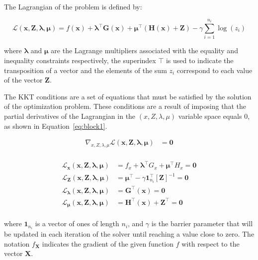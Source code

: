 The Lagrangian of the problem is defined by:

\begin{equation}
    \mathcal{L}(\bm{x}, \bm{Z}, \bm{\lambda}, \bm{\mu}) = f(\bm{x}) + \bm{\lambda}^\top \bm{G}(\bm{x}) + \bm{\mu}^\top (\bm{H}(\bm{x})+\bm{Z}) - \gamma \sum_{i=1}^{n_i} \log(z_i) 
    \label{eq:lag}
\end{equation}
    
where $\bm{\lambda}$ and $\bm{\mu}$ are the Lagrange multipliers associated with the equality and inequality constraints respectively, the superindex $\top$ is used to indicate the transposition
of a vector and the elements of the sum $z_i$ correspond to each value of the vector $\bm{Z}$.

The KKT conditions are a set of equations that must be satisfied by the solution of the optimization problem. These conditions are a result of 
imposing that the partial derivatives of the Lagrangian in the $(x, Z, \lambda, \mu)$ variable space equals 0, as shown in Equation~\eqref{eq:block1}.

\begin{equation}
    \begin{split}
    \nabla_{x, Z, \lambda, \mu} \mathcal{L}(\bm{x}, \bm{Z}, \bm{\lambda}, \bm{\mu}) &= \bm{0} \\
    \end{split}
    \end{equation}

\begin{equation}
    \begin{split}
    \bm{\mathcal{L}_x}(\bm{x}, \bm{Z}, \bm{\lambda}, \bm{\mu}) &=  f_x + \bm{\lambda}^\top G_x + \bm{\mu}^\top H_x = \bm{0} \\
    \bm{\mathcal{L}_Z}(\bm{x}, \bm{Z}, \bm{\lambda}, \bm{\mu}) &=  \bm{\mu}^\top - \gamma \bm{1}_{n_i}^\top[\bm{Z}]^{-1} = \bm{0} \\
    \bm{\mathcal{L}_{\lambda}}(\bm{x}, \bm{Z}, \bm{\lambda}, \bm{\mu}) &=  \bm{G}^\top(\bm{x}) = \bm{0} \\
    \bm{\mathcal{L}_{\mu}}(\bm{x}, \bm{Z}, \bm{\lambda}, \bm{\mu}) &=  \bm{H}^\top(\bm{x}) + \bm{Z}^\top = \bm{0} \\
    \end{split}
    \label{eq:block1}
\end{equation}

where $\bm{1}_{n_i}$ is a vector of ones of length $n_i$, and $\gamma$ is the barrier parameter that will be updated in each iteration of the solver until
reaching a value close to zero. The notation $f_{\bm{X}}$ indicates the gradient of the given function $f$ with respect to the vector $\bm{X}$.

